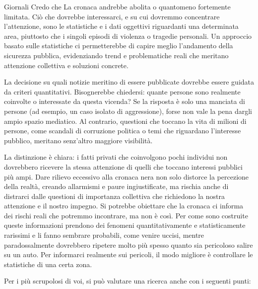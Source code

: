 \documentclass[12pt]{book} %
\begin{document}
\begin{mdframed}[linewidth=1pt]
Giornali
Credo che La cronaca andrebbe abolita o quantomeno fortemente limitata. Ciò che dovrebbe interessarci, e su cui dovremmo concentrare l'attenzione, sono le statistiche e i dati oggettivi riguardanti una determinata area, piuttosto che i singoli episodi di violenza o tragedie personali. Un approccio basato sulle statistiche ci permetterebbe di capire meglio l'andamento della sicurezza pubblica, evidenziando trend e problematiche reali che meritano attenzione collettiva e soluzioni concrete.

La decisione su quali notizie meritino di essere pubblicate dovrebbe essere guidata da criteri quantitativi. Bisognerebbe chiedersi: quante persone sono realmente coinvolte o interessate da questa vicenda? Se la risposta è solo una manciata di persone (ad esempio, un caso isolato di aggressione), forse non vale la pena dargli ampio spazio mediatico. Al contrario, questioni che toccano la vita di milioni di persone, come scandali di corruzione politica o temi che riguardano l'interesse pubblico, meritano senz'altro maggiore visibilità.

La distinzione è chiara: i fatti privati che coinvolgono pochi individui non dovrebbero ricevere la stessa attenzione di quelli che toccano interessi pubblici più ampi. Dare rilievo eccessivo alla cronaca nera non solo distorce la percezione della realtà, creando allarmismi e paure ingiustificate, ma rischia anche di distrarci dalle questioni di importanza collettiva che richiedono la nostra attenzione e il nostro impegno. Si potrebbe obiettare che la cronaca ci informa dei rischi reali che potremmo incontrare, ma non è così. Per come sono costruite queste informazioni prendono dei fenomeni quantitativamente e statisticamente rarissimi e li fanno sembrare probabili, come venire uccisi, mentre paradossalmente dovrebbero ripetere molto più spesso quanto sia pericoloso salire su un auto. Per informarci realmente sui pericoli, il modo migliore è controllare le statistiche di una certa zona.
\end{mdframed}

\bigskip

Per i più scrupolosi di voi, si può valutare una ricerca anche con i seguenti punti:


\bigskip
\end{document}
